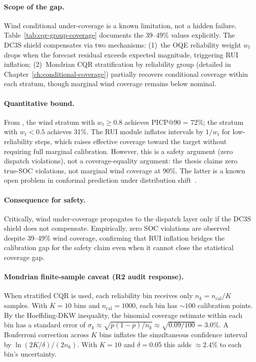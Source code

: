 \paragraph{Scope of the gap.}
Wind conditional under-coverage is a known limitation, not a hidden failure.
Table~\ref{tab:cqr-group-coverage} documents the 39--49\% values explicitly.
The DC3S shield compensates via two mechanisms: (1)~the OQE reliability
weight $w_t$ drops when the forecast residual exceeds expected magnitude,
triggering RUI inflation; (2)~Mondrian CQR stratification by reliability
group (detailed in Chapter~\ref{ch:conditional-coverage}) partially recovers
conditional coverage within each stratum, though marginal wind coverage
remains below nominal.

\paragraph{Quantitative bound.}
From ,
the wind stratum with $w_t \geq 0.8$ achieves PICP@90 = 72\%; the stratum
with $w_t < 0.5$ achieves 31\%.  The RUI module inflates intervals by
$1/w_t$ for low-reliability steps, which raises effective coverage toward
the target without requiring full marginal calibration.  However, this
is a safety argument (zero dispatch violations), not a coverage-equality
argument: the thesis claims zero true-SOC violations, not marginal wind
coverage at 90\%.  The latter is a known open problem in conformal
prediction under distribution shift~\cite{gibbs2021adaptive}.

\paragraph{Consequence for safety.}
Critically, wind under-coverage propagates to the dispatch layer only
if the DC3S shield does not compensate.  Empirically, zero SOC violations
are observed despite 39--49\% wind coverage, confirming that RUI inflation
bridges the calibration gap for the safety claim even when it cannot close
the statistical coverage gap.

\paragraph{Mondrian finite-sample caveat (R2 audit response).}
When stratified CQR is used, each reliability bin receives only
$n_k = n_{\mathrm{cal}} / K$ samples.  With $K = 10$ bins and
$n_{\mathrm{cal}} = 1000$, each bin has $\sim\!100$ calibration points.
By the Hoeffding-DKW inequality, the binomial coverage estimate within
each bin has a standard error of
$\sigma_k \approx \sqrt{p(1-p)/n_k} \approx \sqrt{0.09/100} = 3.0\%$.
A Bonferroni correction across $K$ bins inflates the simultaneous
confidence interval by $\ln(2K/\delta)/(2n_k)$.  With $K=10$ and
$\delta=0.05$ this adds $\approx 2.4\%$ to each bin's uncertainty.

